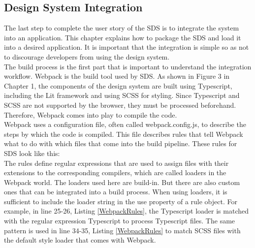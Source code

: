 \subsection{Design System Integration}
The last step to complete the user story of the SDS is to integrate the system into an application. This chapter explains how to package the SDS and load it into a desired application. It is important that the integration is simple so as not to discourage developers from using the design system. \\

The build process is the first part that is important to understand the integration workflow. Webpack is the build tool used by SDS. As shown in Figure 3 in Chapter 1, the components of the design system are built using Typescript, including the Lit framework and using SCSS for styling. Since Typescript and SCSS are not supported by the browser, they must be processed beforehand. Therefore, Webpack comes into play to compile the code. \\
Webpack uses a configuration file, often called webpack.config.js, to describe the steps by which the code is compiled. This file describes rules that tell Webpack what to do with which files that come into the build pipeline. These rules for SDS look like this:\\

The rules define regular expressions that are used to assign files with their extensions to the corresponding compilers, which are called loaders in the Webpack world. The loaders used here are build-in. But there are also custom ones that can be integrated into a build process. When using loaders, it is sufficient to include the loader string in the use property of a rule object. For example, in line 25-26, Listing \ref{WebpackRules}, the Typescript loader is matched with the regular expression Typescript to process Typescript files. The same pattern is used in line 34-35, Listing \ref{WebpackRules} to match SCSS files with the default style loader that comes with Webpack.